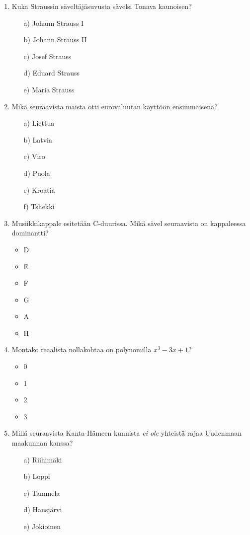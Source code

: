 \documentclass[a4paper,12pt,twoside]{article}
\begin{document}
\begin{enumerate}
\item{Kuka Straussin säveltäjäsuvusta sävelsi Tonava kaunoisen?}
  \begin{itemize}
  \item[a)]{Johann Strauss I}
  \item[b)]{Johann Strauss II}
  \item[c)]{Josef Strauss}
  \item[d)]{Eduard Strauss}
  \item[e)]{Maria Strauss}
  \end{itemize}
\item{Mikä seuraavista maista otti eurovaluutan käyttöön ensimmäisenä?}
  \begin{itemize}
  \item[a)]{Liettua}
  \item[b)]{Latvia}
  \item[c)]{Viro}
  \item[d)]{Puola}
  \item[e)]{Kroatia}
  \item[f)]{Tshekki}
  \end{itemize}
\item{Musiikkikappale esitetään C-duurissa. Mikä sävel seuraavista on kappaleessa dominantti?}
  \begin{itemize}
  \item{D}
  \item{E}
  \item{F}
  \item{G}
  \item{A}
  \item{H}
  \end{itemize}
  \newpage
\item{Montako reaalista nollakohtaa on polynomilla $x^3-3x+1$?}
  \begin{itemize}
  \item{0}
  \item{1}
  \item{2}
  \item{3}
  \end{itemize}
\item{Millä seuraavista Kanta-Hämeen kunnista \emph{ei ole} yhteistä rajaa Uudenmaan maakunnan kanssa?}
  \begin{itemize}
  \item[a)]{Riihimäki}
  \item[b)]{Loppi}
  \item[c)]{Tammela}
  \item[d)]{Hausjärvi}
  \item[e)]{Jokioinen}

\end{itemize}
\end{enumerate}
\end{document}
